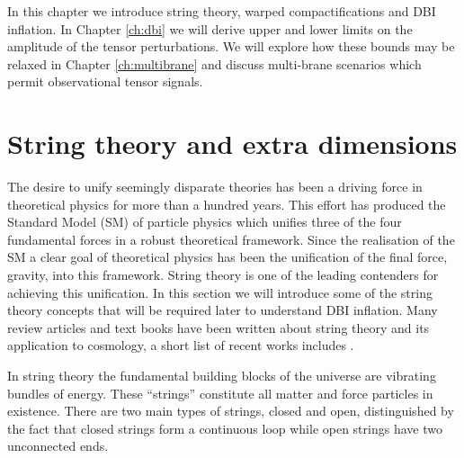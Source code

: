 In this chapter we introduce string theory, warped compactifications and DBI inflation.
In Chapter \ref{ch:dbi} we will derive upper and lower 
limits on the amplitude of the tensor perturbations.  
We will explore how these bounds may be relaxed in Chapter \ref{ch:multibrane} and discuss
multi-brane 
scenarios which permit observational tensor signals. 

\section{String theory and extra dimensions}
\label{sec:extradims}
The desire to unify seemingly disparate theories has been a driving force in
theoretical physics for more than a hundred years. This effort has produced 
the Standard Model (SM) of particle physics which unifies three of the four
fundamental forces in a robust theoretical framework. Since the realisation of
the SM a clear goal of theoretical physics has been the unification of the
final force, gravity, into this framework. String theory is one of the leading
contenders for achieving this unification. 
In this section we will introduce
some of the string theory concepts that will be required later to understand DBI
inflation.
Many review articles and text books have been written about string theory and
its application to cosmology, a short list of recent works includes
\cite{cline, Johnson2000, Baumann:2009ni,Kallosh:2007wm,
Linde:2005dd,McAllister:2007bg}.


In string theory the fundamental
building blocks of the
universe are vibrating bundles of energy. These ``strings'' constitute all matter and force
particles in existence.
There are two main
types of strings, closed and open, distinguished by the fact that closed
strings form a continuous loop while open strings have two unconnected ends. 
% 


